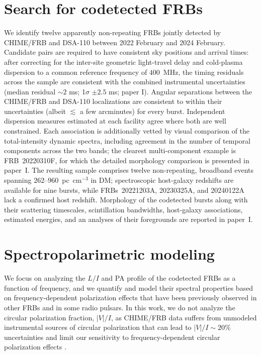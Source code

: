 \documentclass[twocolumn, linenumbers]{aastex701}
\begin{document}
\section{Search for codetected FRBs} \label{sec:obs_codetections}
We identify twelve apparently non-repeating FRBs jointly detected by CHIME/FRB and DSA-110 between 2022 February and 2024 February. Candidate pairs are required to have consistent sky positions and arrival times: after correcting for the inter-site geometric light-travel delay and cold-plasma dispersion to a common reference frequency of $400$~MHz, the timing residuals across the sample are consistent with the combined instrumental uncertainties (median residual $\sim 2$ ms; 1$\sigma$ $\pm 2.5$ ms; paper I). Angular separations between the CHIME/FRB and DSA-110 localizations are consistent to within their uncertainties (albeit $\lesssim$ a few arcminutes) for every burst. Independent dispersion measures estimated at each facility agree where both are well constrained. Each association is additionally vetted by visual comparison of the total-intensity dynamic spectra, including agreement in the number of temporal components across the two bands; the clearest multi-component example is FRB~20220310F, for which the detailed morphology comparison is presented in paper~I. The resulting sample comprises twelve non-repeating, broadband events spanning $262$--$960$~pc~cm$^{-3}$ in DM; spectroscopic host-galaxy redshifts are available for nine bursts, while FRBs~20221203A, 20230325A, and 20240122A lack a confirmed host redshift. Morphology of the codetected bursts along with their scattering timescales, scintillation bandwidths, host-galaxy associations, estimated energies, and an analyses of their foregrounds are reported in paper~I.


\section{Spectropolarimetric modeling} \label{sec:models}
We focus on analyzing the $L/I$ and PA profile of the codetected FRBs as a function of frequency, and we quantify and model their spectral properties based on frequency-dependent polarization effects that have been previously observed in other FRBs and in some radio pulsars. In this work, we do not analyze the circular polarization fraction, $|V|/I$, as CHIME/FRB data suffers from unmodeled instrumental sources of circular polarization that can lead to $|V|/I\sim 20\%$ uncertainties and limit our sensitivity to frequency-dependent circular polarization effects \citep{2021ApJ...920..138M}.
\end{document}
